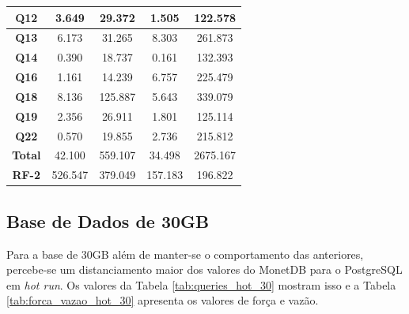 \begin{table}[t]
\begin{tabular}{|c|c|c|c|c|}
                 \textbf{Q12}         & 3.649             & 29.372                        & 1.505             & 122.578                   \\ 
                \hline
                 \textbf{Q13}         & 6.173             & 31.265                        & 8.303             & 261.873                   \\ 
                \hline
                 \textbf{Q14}         & 0.390             & 18.737                        & 0.161             & 132.393                   \\ 
                \hline
                 \textbf{Q16}         & 1.161             & 14.239                        & 6.757             & 225.479                   \\ 
                \hline
                 \textbf{Q18}         & 8.136             & 125.887                       & 5.643             & 339.079                   \\ 
                \hline
                 \textbf{Q19}         & 2.356             & 26.911                        & 1.801             & 125.114                   \\ 
                \hline
                 \textbf{Q22}         & 0.570             & 19.855                        & 2.736             & 215.812                   \\ 
                \hline
                 \textbf{Total}       & 42.100            & 559.107                       & 34.498            & 2675.167                  \\ 
                \hline
                 \textbf{RF-2}        & 526.547           & 379.049                       & 157.183           & 196.822                   \\
                \hline
                \end{tabular}
                \end{table}

\subsection{Base de Dados de 30GB}

Para a base de 30GB além de manter-se o comportamento das anteriores, percebe-se um distanciamento maior dos valores do MonetDB para o PostgreSQL em \textit{hot run}. Os valores da Tabela \ref{tab:queries_hot_30} mostram isso e a Tabela \ref{tab:forca_vazao_hot_30} apresenta os valores de força e vazão.

